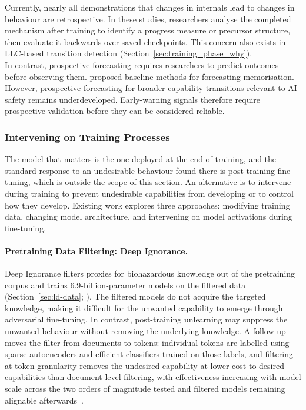 \begin{warningbox}
Currently, nearly all demonstrations that changes in internals lead to changes in behaviour are retrospective. In these studies, researchers analyse the completed mechanism after training to identify a progress measure or precursor structure, then evaluate it backwards over saved checkpoints. This concern also exists in LLC-based transition detection (Section~\ref{sec:training_phase_why}).\\

In contrast, prospective forecasting requires researchers to predict outcomes before observing them.  proposed baseline methods for forecasting memorisation. However, prospective forecasting for broader capability transitions relevant to AI safety remains underdeveloped. Early-warning signals therefore require prospective validation before they can be considered reliable.

\end{warningbox}

\subsubsection{Intervening on Training Processes}
\label{sec:ld-intervening}

The model that matters is the one deployed at the end of training, and the standard response to an undesirable behaviour found there is post-training fine-tuning, which is outside the scope of this section. An alternative is to intervene during training to prevent undesirable capabilities from developing or to control how they develop. Existing work explores three approaches: modifying training data, changing model architecture, and intervening on model activations during fine-tuning.

\paragraph{Pretraining Data Filtering: Deep Ignorance.} Deep Ignorance filters proxies for biohazardous knowledge out of the pretraining corpus and trains 6.9-billion-parameter models on the filtered data (Section~\ref{sec:ld-data}; ). The filtered models do not acquire the targeted knowledge, making it difficult for the unwanted capability to emerge through adversarial fine-tuning. In contrast, post-training unlearning may suppress the unwanted behaviour without removing the underlying knowledge. A follow-up moves the filter from documents to tokens: individual tokens are labelled using sparse autoencoders and efficient classifiers trained on those labels, and filtering at token granularity removes the undesired capability at lower cost to desired capabilities than document-level filtering, with effectiveness increasing with model scale across the two orders of magnitude tested and filtered models remaining alignable afterwards~.

